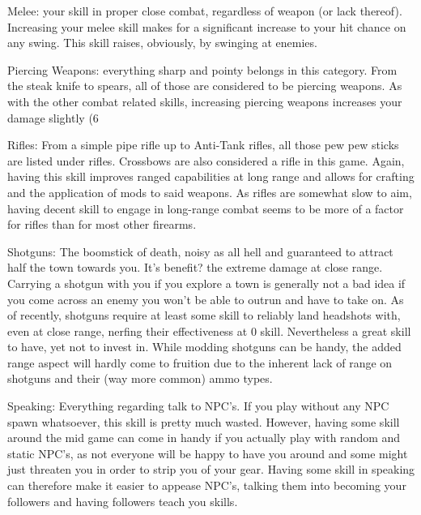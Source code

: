 \documentclass[11pt]{report}
\begin{document}
Melee: your skill in proper close combat, regardless of weapon (or lack thereof). Increasing your melee skill makes for a significant increase to your hit chance on any swing. This skill raises, obviously, by swinging at enemies.

Piercing Weapons: everything sharp and pointy belongs in this category. From the steak knife to spears, all of those are considered to be piercing weapons. As with the other combat related skills, increasing piercing weapons increases your damage slightly (6%

Rifles: From a simple pipe rifle up to Anti-Tank rifles, all those pew pew sticks are listed under rifles. Crossbows are also considered a rifle in this game. Again, having this skill improves ranged capabilities at long range and allows for crafting and the application of mods to said weapons. As rifles are somewhat slow to aim, having decent skill to engage in long-range combat seems to be more of a factor for rifles than for most other firearms.

Shotguns: The boomstick of death, noisy as all hell and guaranteed to attract half the town towards you. It's benefit? the extreme damage at close range. Carrying a shotgun with you if you explore a town is generally not a bad idea if you come across an enemy you won't be able to outrun and have to take on. As of recently, shotguns require at least some skill to reliably land headshots with, even at close range, nerfing their effectiveness at 0 skill. Nevertheless a great skill to have, yet not to invest in. While modding shotguns can be handy, the added range aspect will hardly come to fruition due to the inherent lack of range on shotguns and their (way more common) ammo types.

Speaking: Everything regarding talk to NPC's. If you play without any NPC spawn whatsoever, this skill is pretty much wasted. However, having some skill around the mid game can come in handy if you actually play with random and static NPC's, as not everyone will be happy to have you around and some might just threaten you in order to strip you of your gear. Having some skill in speaking can therefore make it easier to appease NPC's, talking them into becoming your followers and having followers teach you skills.
\end{document}

